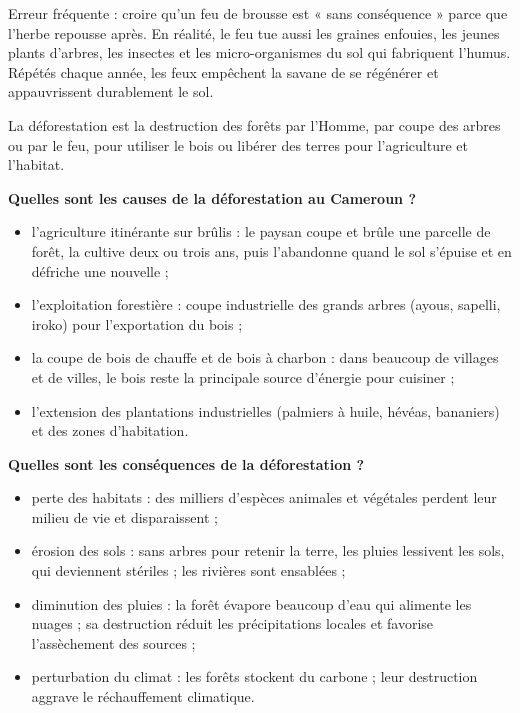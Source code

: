 \documentclass[11pt]{article}
\newcommand{\cle}[1]{{\popxbold\color{popdark}#1}}
\newcounter{popsec}
\newcounter{popsub}
\newcommand{\courssub}[1]{%
  \stepcounter{popsub}%
  \par\vspace{9pt}\noindent{\popxbold\fontsize{11.5}{13}\selectfont\color{popink}{\color{poporange}\thepopsec.\thepopsub}\hspace{6pt}#1}\par\nopagebreak\vspace{4pt}
}
\begin{document}
\begin{attention}
Erreur fréquente : croire qu'un feu de brousse est « sans conséquence » parce que l'herbe repousse après. En réalité, le feu tue aussi les \cle{graines} enfouies, les \cle{jeunes plants} d'arbres, les \cle{insectes} et les \cle{micro-organismes} du sol qui fabriquent l'humus. Répétés chaque année, les feux empêchent la savane de se régénérer et appauvrissent durablement le sol.
\end{attention}

\courssub{La déforestation}

\begin{definition}[Déforestation]
La \cle{déforestation} est la destruction des forêts par l'Homme, par coupe des arbres ou par le feu, pour utiliser le bois ou libérer des terres pour l'agriculture et l'habitat.
\end{definition}

\textbf{Quelles sont les causes de la déforestation au Cameroun ?}

\begin{itemize}
\item l'\cle{agriculture itinérante sur brûlis} : le paysan coupe et brûle une parcelle de forêt, la cultive deux ou trois ans, puis l'abandonne quand le sol s'épuise et en défriche une nouvelle ;
\item l'\cle{exploitation forestière} : coupe industrielle des grands arbres (ayous, sapelli, iroko) pour l'exportation du bois ;
\item la coupe de \cle{bois de chauffe} et de bois à charbon : dans beaucoup de villages et de villes, le bois reste la principale source d'énergie pour cuisiner ;
\item l'extension des \cle{plantations} industrielles (palmiers à huile, hévéas, bananiers) et des zones d'habitation.
\end{itemize}

\textbf{Quelles sont les conséquences de la déforestation ?}

\begin{itemize}
\item \cle{perte des habitats} : des milliers d'espèces animales et végétales perdent leur milieu de vie et disparaissent ;
\item \cle{érosion des sols} : sans arbres pour retenir la terre, les pluies lessivent les sols, qui deviennent stériles ; les rivières sont ensablées ;
\item \cle{diminution des pluies} : la forêt évapore beaucoup d'eau qui alimente les nuages ; sa destruction réduit les précipitations locales et favorise l'assèchement des sources ;
\item perturbation du \cle{climat} : les forêts stockent du carbone ; leur destruction aggrave le réchauffement climatique.
\end{itemize}
\end{document}
